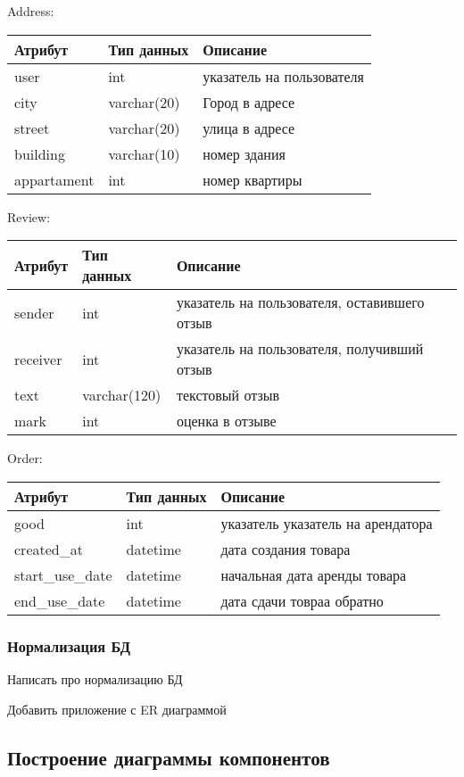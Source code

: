 Address:
\bigbreak
\begin{tabular}{ | l | l | l | }
    \hline
    Атрибут & Тип данных & Описание  \\ \hline
    user & int & указатель на пользователя \\ \hline
    city & varchar(20) & Город в адресе \\ \hline
    street & varchar(20) & улица в адресе \\ \hline
    building & varchar(10) & номер здания  \\ \hline
    appartament & int & номер квартиры \\
    \hline
\end{tabular}
\bigbreak

Review:
\bigbreak
\begin{tabular}{ | l | l | l | }
    \hline
    Атрибут & Тип данных & Описание  \\ \hline
    sender & int & указатель на пользователя, оставившего отзыв \\ \hline
    receiver & int & указатель на пользователя, получивший отзыв \\ \hline
    text & varchar(120) & текстовый отзыв \\ \hline
    mark & int & оценка в отзыве \\
    \hline
\end{tabular}
\bigbreak

Order:
\bigbreak
\begin{tabular}{ | l | l | l | }
    \hline
    Атрибут & Тип данных & Описание  \\ \hline
    good & int & указатель указатель на арендатора \\ \hline
    created\_at & datetime & дата создания товара  \\ \hline
    start\_use\_date & datetime & начальная дата аренды товара \\ \hline
    end\_use\_date & datetime & дата сдачи товраа обратно \\
\hline
\end{tabular}

\subsubsection{Нормализация БД}
Написать про нормализацию БД

Добавить приложение с ER диаграммой

\subsection{Построение диаграммы компонентов}
